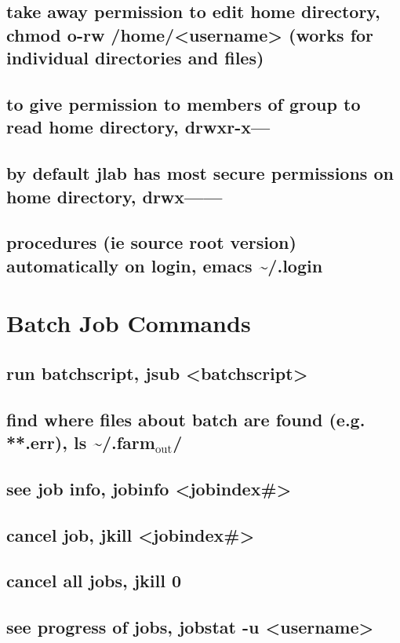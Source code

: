 \documentclass[11pt]{article}
\begin{document}
\subsection{take away permission to edit home directory, chmod o-rw /home/<username> (works for individual directories and files)}
\label{sec:org94157f3}
\subsection{to give permission to members of group to read home directory, drwxr-x---}
\label{sec:org12009fe}
\subsection{by default jlab has most secure permissions on home directory, drwx------}
\label{sec:org49215e5}
\subsection{procedures (ie source root version) automatically on login, emacs \textasciitilde{}/.login}
\label{sec:org42fdb83}
\section{Batch Job Commands}
\label{sec:orgcd48d7e}
\subsection{run batchscript, jsub <batchscript>}
\label{sec:org4e3562e}
\subsection{find where files about batch are found (e.g. **.err), ls \textasciitilde{}/.farm\(_{\text{out}}\)/}
\label{sec:orgd430d37}
\subsection{see job info, jobinfo <jobindex\#>}
\label{sec:org88a2383}
\subsection{cancel job, jkill <jobindex\#>}
\label{sec:org7da64bb}
\subsection{cancel all jobs, jkill 0}
\label{sec:orgd1e58d6}
\subsection{see progress of jobs, jobstat -u <username>}
\label{sec:org348a4fb}
\end{document}
